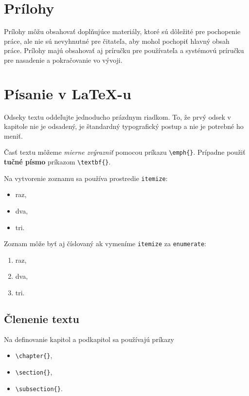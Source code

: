 \section*{Prílohy}

Prílohy môžu obsahovať doplňujúce materiály, ktoré sú dôležité pre pochopenie práce, ale nie sú nevyhnutné pre čitateľa, aby mohol pochopiť hlavný obsah práce. Prílohy majú obsahovať aj príručku pre používateľa a systémovú príručku pre nasadenie a pokračovanie vo vývoji.


\section*{Písanie v \LaTeX-u}

Odseky textu oddeľujte jednoducho prázdnym riadkom. To, že prvý odsek v kapitole nie je odsadený, je štandardný typografický postup a nie je potrebné ho meniť.

Časť textu môžeme \emph{mierne zvýrazniť} pomocou príkazu \verb|\emph{}|. Prípadne použiť \textbf{tučné písmo} príkazom \verb|\textbf{}|.

Na vytvorenie zoznamu sa používa prostredie \texttt{itemize}:

\begin{itemize}
  \item raz,
  \item dva,
  \item tri.
\end{itemize}

Zoznam môže byť aj číslovaný ak vymeníme \texttt{itemize} za \texttt{enumerate}:

\begin{enumerate}
  \item raz,
  \item dva,
  \item tri.
\end{enumerate}

\subsection*{Členenie textu}

Na definovanie kapitol a podkapitol sa používajú príkazy
\begin{itemize}
  \item \verb|\chapter{}|,
  \item \verb|\section{}|,
  \item \verb|\subsection{}|.
\end{itemize}

